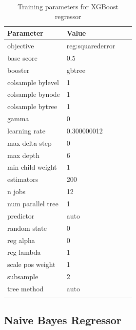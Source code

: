 \documentclass[sn-mathphys]{sn-jnl}%
\theoremstyle{thmstyleone}%
\theoremstyle{thmstyletwo}%
\theoremstyle{thmstylethree}%
\begin{document}
\begin{table}[h!]
      \begin{center}
      \begin{minipage}{174pt}
      \caption{Training parameters for XGBoost regressor}\label{table_xgboost_training_params}%
      \begin{tabular}{@{}llll@{}}
      \toprule
      Parameter               & Value \\
      \midrule
      objective               & reg:squarederror  \\
      base score              & 0.5 \\
      booster                 & gbtree  \\
      colsample bylevel       & 1 \\
      colsample bynode        & 1 \\
      colsample bytree        & 1 \\
      gamma\footnotemark[1]   & 0 \\
      learning rate           & 0.300000012 \\
      max delta step          & 0 \\
      max depth               & 6 \\
      min child weight        & 1 \\
      estimators              & 200  \\
      n jobs                  & 12  \\
      num parallel tree       & 1 \\
      predictor               & auto  \\
      random state            & 0 \\
      reg alpha               & 0 \\
      reg lambda              & 1 \\
      scale pos weight        & 1 \\
      subsample               & 2 \\
      tree method             & auto  \\
      \botrule
      \end{tabular}
      \end{minipage}
      \end{center}
\end{table}


\subsection{Naive Bayes Regressor}
\end{document}
